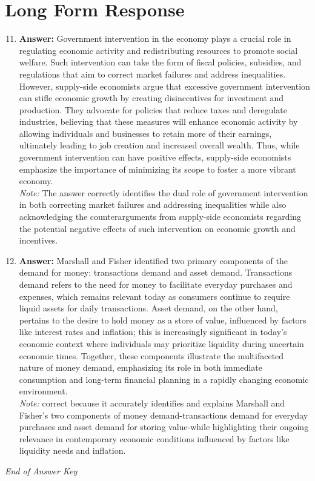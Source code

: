 \documentclass[12pt]{article}
\begin{document}
\section*{Long Form Response}
\begin{enumerate}[label=\arabic*.]
\setcounter{enumi}{10}
\item \textbf{Answer:} Government intervention in the economy plays a crucial role in regulating economic activity and redistributing resources to promote social welfare. Such intervention can take the form of fiscal policies, subsidies, and regulations that aim to correct market failures and address inequalities. However, supply-side economists argue that excessive government intervention can stifle economic growth by creating disincentives for investment and production. They advocate for policies that reduce taxes and deregulate industries, believing that these measures will enhance economic activity by allowing individuals and businesses to retain more of their earnings, ultimately leading to job creation and increased overall wealth. Thus, while government intervention can have positive effects, supply-side economists emphasize the importance of minimizing its scope to foster a more vibrant economy.
\\ \textit{Note:} The answer correctly identifies the dual role of government intervention in both correcting market failures and addressing inequalities while also acknowledging the counterarguments from supply-side economists regarding the potential negative effects of such intervention on economic growth and incentives.
\item \textbf{Answer:} Marshall and Fisher identified two primary components of the demand for money: transactions demand and asset demand. Transactions demand refers to the need for money to facilitate everyday purchases and expenses, which remains relevant today as consumers continue to require liquid assets for daily transactions. Asset demand, on the other hand, pertains to the desire to hold money as a store of value, influenced by factors like interest rates and inflation; this is increasingly significant in today's economic context where individuals may prioritize liquidity during uncertain economic times. Together, these components illustrate the multifaceted nature of money demand, emphasizing its role in both immediate consumption and long-term financial planning in a rapidly changing economic environment.
\\ \textit{Note:} correct because it accurately identifies and explains Marshall and Fisher's two components of money demand-transactions demand for everyday purchases and asset demand for storing value-while highlighting their ongoing relevance in contemporary economic conditions influenced by factors like liquidity needs and inflation.
\end{enumerate}

\vfill
\noindent\textit{End of Answer Key}
\end{document}
